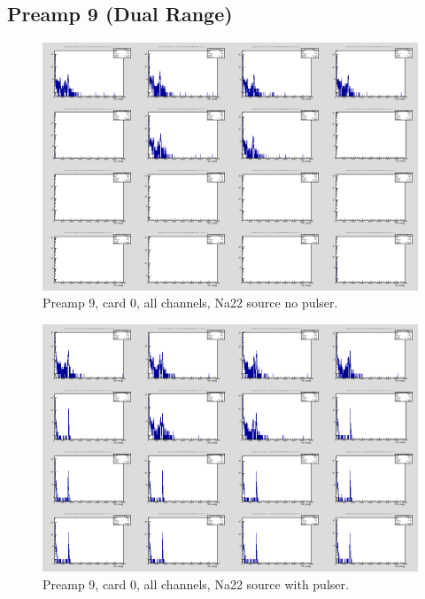 \documentclass{report}
\begin{document}
\subsection{Preamp 9 (Dual Range)}
\begin{figure}[!htb]
  \includegraphics[width=\linewidth]{dr_latest_test/preamp9_lim_energy_card0_all_no_pulser.png}
  \caption{Preamp 9, card 0, all channels, Na22 source  no pulser.}
\end{figure}
\begin{figure}[!htb]
  \includegraphics[width=\linewidth]{dr_latest_test/preamp9_lim_energy_card0_pulser.png}
  \caption{Preamp 9, card 0, all channels, Na22 source with pulser.}
\end{figure}
\end{document}
